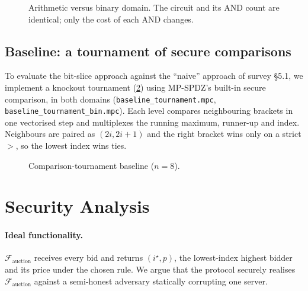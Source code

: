 \documentclass[11pt,a4paper]{article}
\newcommand{\code}[1]{\texttt{#1}}
\begin{document}
\begin{figure}[H]
  \centering
  \resizebox{0.95\linewidth}{!}{}
  \caption{Arithmetic versus binary domain. The circuit and its AND count are identical; only the
           cost of each AND changes.}
  \label{fig:domains}
\end{figure}

\subsection{Baseline: a tournament of secure comparisons}

To evaluate the bit-slice approach against the ``naive'' approach of survey \S5.1, we implement a
knockout tournament (\cref{fig:tournament}) using MP-SPDZ's built-in secure comparison, in both
domains (\code{baseline\_tournament.mpc}, \code{baseline\_tournament\_bin.mpc}). Each level compares
neighbouring brackets in one vectorised step and multiplexes the running maximum, runner-up and
index. Neighbours are paired as $(2i, 2i+1)$ and the right bracket wins only on a strict $>$, so the
lowest index wins ties.

\begin{figure}[H]
  \centering
  \resizebox{0.8\linewidth}{!}{}
  \caption{Comparison-tournament baseline ($n=8$).}
  \label{fig:tournament}
\end{figure}

\section{Security Analysis}
\label{sec:security}

\paragraph{Ideal functionality.}
$\mathcal{F}_\text{auction}$ receives every bid and returns $(i^\star, p)$, the lowest-index
highest bidder and its price under the chosen rule. We argue that the protocol securely realises
$\mathcal{F}_\text{auction}$ against a semi-honest adversary statically corrupting one server.
\end{document}
